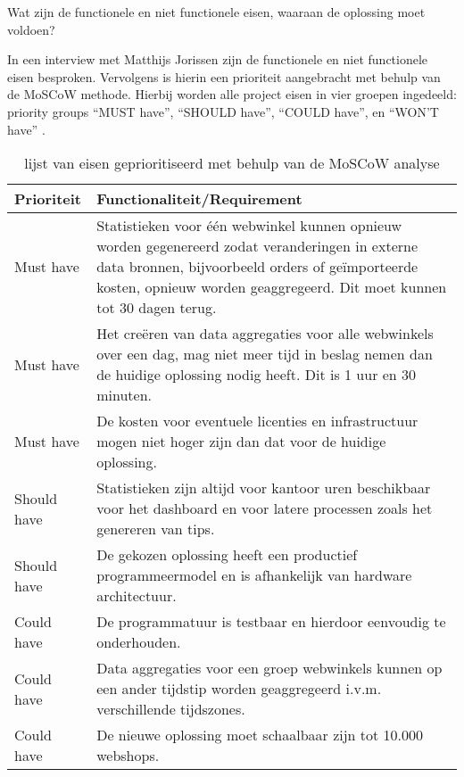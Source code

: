 
Wat zijn de functionele en niet functionele eisen, waaraan de oplossing moet voldoen?

In een interview met Matthijs Jorissen zijn de functionele en niet functionele eisen besproken. Vervolgens is hierin een prioriteit aangebracht met behulp van de MoSCoW methode. Hierbij worden alle project eisen in vier groepen ingedeeld: priority groups “MUST have”, “SHOULD have”, “COULD have”, en “WON’T have” \parencite{ma2009effectiveness}.

\begin{comment}
Een functionele eis kan gezien worden als iets dat de gebruiker nodig heeft om het doel te bereiken of een bepaalde voorwaarde waaraan de oplossing moet voldoen.

Een non functionele eis is een beperking doe wordt opgelegd op een mogelijke oplossing, met het doel om functionele eisen te behalen of het doel van het project.
\end{comment}

\begin{table}[bh]
\centering
\caption{lijst van eisen geprioritiseerd met behulp van de MoSCoW analyse}
\label{table:requirements}
\def\arraystretch{1.5}

\begin{tabular}{|l|p{12.5cm}|}
\hline
\textbf{Prioriteit} & \textbf{Functionaliteit/Requirement}
\\ \hline
Must have           & Statistieken voor één webwinkel kunnen opnieuw worden gegenereerd zodat veranderingen in externe data bronnen, bijvoorbeeld orders of geïmporteerde kosten, opnieuw worden geaggregeerd. Dit moet kunnen tot 30 dagen terug.
\\ \hline
Must have           & Het creëren van data aggregaties voor alle webwinkels over een dag, mag niet meer tijd in beslag nemen dan de huidige oplossing nodig heeft. Dit is 1 uur en 30 minuten.
\\ \hline
Must have           & De kosten voor eventuele licenties en infrastructuur mogen niet hoger zijn dan dat voor de huidige oplossing.
\\ \hline
Should have         & Statistieken zijn altijd voor kantoor uren beschikbaar voor het dashboard en voor latere processen zoals het genereren van tips.
\\ \hline
Should have         & De gekozen oplossing heeft een productief programmeermodel en is afhankelijk van hardware architectuur.
\\ \hline
Could have         & De programmatuur is testbaar en hierdoor eenvoudig te onderhouden.
\\ \hline
Could have          & Data aggregaties voor een groep webwinkels kunnen op een ander tijdstip worden geaggregeerd i.v.m. verschillende tijdszones.
\\ \hline
Could have         & De nieuwe oplossing moet schaalbaar zijn tot 10.000 webshops.
\\ \hline
\end{tabular}
\end{table}

